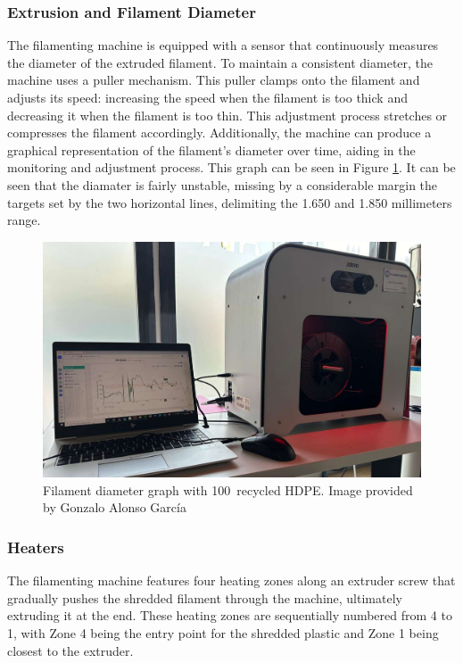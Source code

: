 \subsubsection*{Extrusion and Filament Diameter}
The filamenting machine is equipped with a sensor that continuously measures the diameter of the 
extruded filament. To maintain a consistent diameter, the machine uses a puller mechanism. This 
puller clamps onto the filament and adjusts its speed: increasing the speed when the filament is 
too thick and decreasing it when the filament is too thin. This adjustment process stretches or 
compresses the filament accordingly. Additionally, the machine can produce a graphical 
representation of the filament's diameter over time, aiding in the monitoring and adjustment 
process. This graph can be seen in Figure \ref{fig:filament_graph_2}. It can be seen that the 
diamater is fairly unstable, missing by a considerable margin the targets set by the two 
horizontal lines, delimiting the 1.650 and 1.850 millimeters range.

\begin{figure}[h]
	\centering
	\includegraphics[width = .85\textwidth]{Imagenes/Vectorial/filament_graph_2.pdf}
	\caption{Filament diameter graph with 100\percentsign\ recycled HDPE. Image provided by 
    Gonzalo Alonso García}
	\label{fig:filament_graph_2}
\end{figure}


\subsubsection*{Heaters}
The filamenting machine features four heating zones along an extruder screw that gradually pushes 
the shredded filament through the machine, ultimately extruding it at the end. These heating zones 
are sequentially numbered from 4 to 1, with Zone 4 being the entry point for the shredded plastic 
and Zone 1 being closest to the extruder.

